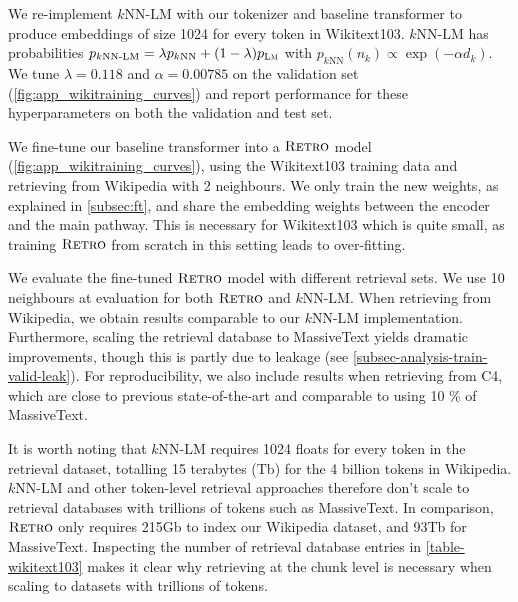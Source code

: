 We re-implement $k\textrm{NN-LM}$ with our tokenizer and baseline transformer to produce embeddings of size 1024 for every token in Wikitext103. $k\textrm{NN-LM}$ has probabilities $p_{k\textrm{NN-LM}}=  \lambda p_{k\textrm{NN}} + (1-\lambda) p_{\textsc{Lm}}  $ with $p_{k\textrm{NN}} \left (n_k \right ) \propto \exp \left (-\alpha d_k \right )$. We tune $\lambda=0.118$ and $\alpha=0.00785$ on the validation set (\autoref{fig:app_wikitraining_curves}) and report performance for these hyperparameters on both the validation and test set.

We fine-tune our baseline transformer into a $\textsc{Retro}$ model (\autoref{fig:app_wikitraining_curves}), using the Wikitext103 training data and retrieving from Wikipedia with 2 neighbours. We only train the new weights, as explained in \autoref{subsec:ft}, and share the embedding weights between the encoder and the main pathway. This is necessary for Wikitext103 which is quite small, as training $\textsc{Retro}$ from scratch in this setting leads to over-fitting. 

We evaluate the fine-tuned $\textsc{Retro}$ model with different retrieval sets. We use 10 neighbours at evaluation for both $\textsc{Retro}$ and $k\textrm{NN-LM}$.  
When retrieving from Wikipedia, we obtain results comparable to our $k\textrm{NN-LM}$ implementation. Furthermore, scaling the retrieval database to MassiveText yields dramatic improvements, though this is partly due to leakage (see \autoref{subsec-analysis-train-valid-leak}).
For reproducibility, we also include results when retrieving from C4, which are close to previous state-of-the-art and comparable to using 10 \% of MassiveText. 

It is worth noting that $k\textrm{NN-LM}$ requires 1024 floats for every token in the retrieval dataset, totalling 15 terabytes (Tb) for the 4 billion tokens in Wikipedia.
$k\textrm{NN-LM}$ and other token-level retrieval approaches therefore don't scale to retrieval databases with trillions of tokens such as MassiveText. In comparison, $\textsc{Retro}$ only requires 215Gb to index our Wikipedia dataset, and 93Tb for MassiveText. Inspecting the number of retrieval database entries in \autoref{table-wikitext103} makes it clear why retrieving at the chunk level is necessary when scaling to datasets with trillions of tokens.

